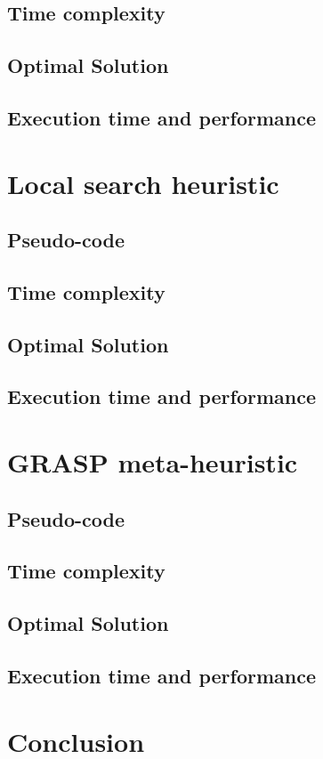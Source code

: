 \documentclass[a4paper, 12pt]{report}
\begin{document}
		\section{Time complexity}
		\section{Optimal Solution}
		\section{Execution time and performance}
	
	\chapter{Local search heuristic}
		\section{Pseudo-code}
			\begin{algorithm}
				
			\end{algorithm}
		
		\section{Time complexity}
		\section{Optimal Solution}
		\section{Execution time and performance}
	
	\chapter{GRASP meta-heuristic}
		\section{Pseudo-code}
			\begin{algorithm}
				
			\end{algorithm}
		\section{Time complexity}
		\section{Optimal Solution}
		\section{Execution time and performance}
	
	\chapter{Conclusion}
	
	
	
	
\end{document}
